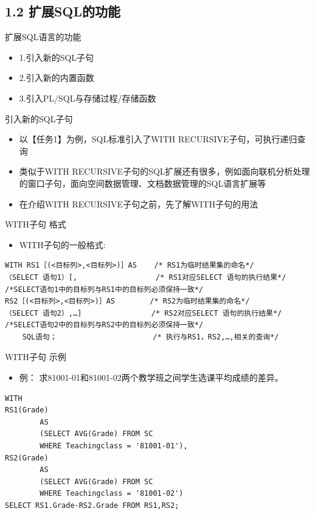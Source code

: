 \subsection{1.2 扩展SQL的功能}
\begin{frame}[allowframebreaks]{扩展SQL语言的功能}
\begin{itemize}
    \item 1.引入新的SQL子句
    \item 2.引入新的内置函数
    \item 3.引入PL/SQL与存储过程/存储函数
\end{itemize}
\end{frame}

\begin{frame}[allowframebreaks]{引入新的SQL子句}
\begin{itemize}
    \item 以【任务1】为例，SQL标准引入了WITH RECURSIVE子句，可执行递归查询
    \item 类似于WITH RECURSIVE子句的SQL扩展还有很多，例如面向联机分析处理的窗口子句，面向空间数据管理、文档数据管理的SQL语言扩展等
    \item 在介绍WITH RECURSIVE子句之前，先了解WITH子句的用法
\end{itemize}
\end{frame}

\begin{frame}{WITH子句 格式}
\begin{itemize}
    \item WITH子句的一般格式:
\end{itemize}
    \begin{block}{}
\begin{lstlisting}
WITH RS1［(<目标列>,<目标列>)］AS    /* RS1为临时结果集的命名*/
（SELECT 语句1）[,                  /* RS1对应SELECT 语句的执行结果*/
/*SELECT语句1中的目标列与RS1中的目标列必须保持一致*/
RS2［(<目标列>,<目标列>)］AS        /* RS2为临时结果集的命名*/
（SELECT 语句2）,…]                /* RS2对应SELECT 语句的执行结果*/
/*SELECT语句2中的目标列与RS2中的目标列必须保持一致*/
    SQL语句；                      /* 执行与RS1，RS2,…,相关的查询*/
\end{lstlisting}
\end{block} 
\end{frame}

\begin{frame}{WITH子句 示例}
\begin{itemize}
\item 例： 求81001-01和81001-02两个教学班之间学生选课平均成绩的差异。
\end{itemize}
    \begin{block}{}
\begin{lstlisting}
WITH 
RS1(Grade)
        AS 
        (SELECT AVG(Grade) FROM SC 
        WHERE Teachingclass = '81001-01'),
RS2(Grade)
        AS 
        (SELECT AVG(Grade) FROM SC 
        WHERE Teachingclass = '81001-02')
SELECT RS1.Grade-RS2.Grade FROM RS1,RS2;
\end{lstlisting}
\end{block} 
\end{frame}

